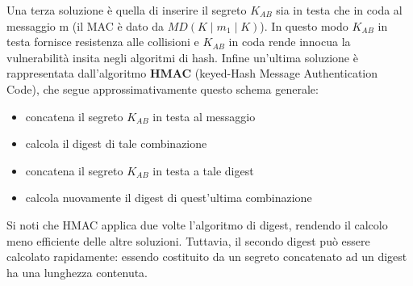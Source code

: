 Una terza soluzione è quella di inserire il segreto $K_{AB}$ sia in testa che in coda al messaggio m (il MAC è dato da $MD(K \mid m_1 \mid K)$). In questo modo $K_{AB}$ in testa fornisce resistenza alle collisioni e $K_{AB}$ in coda rende innocua la vulnerabilità insita negli algoritmi di hash.
\newline \newline
Infine un'ultima soluzione è rappresentata dall'algoritmo \textbf{HMAC} (keyed-Hash Message Authentication Code), che segue approssimativamente questo schema generale:
\begin{itemize}
\item concatena il segreto $K_{AB}$ in testa al messaggio
\item calcola il digest di tale combinazione
\item concatena il segreto $K_{AB}$ in testa a tale digest
\item calcola nuovamente il digest di quest'ultima combinazione
\end{itemize}
Si noti che HMAC applica due volte l'algoritmo di digest, rendendo il calcolo meno efficiente delle altre soluzioni. Tuttavia, il secondo digest può essere calcolato rapidamente: essendo costituito da un segreto concatenato ad un digest ha una lunghezza contenuta.

